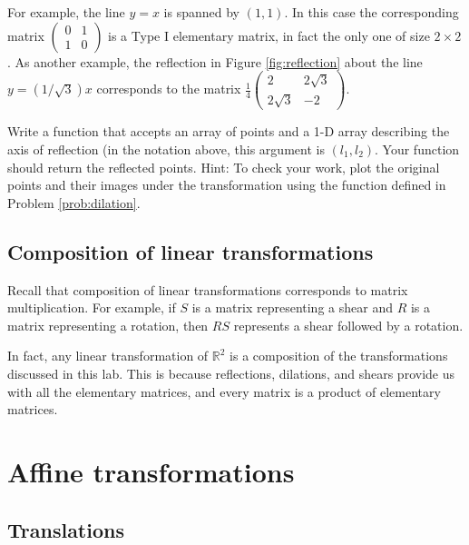 For example, the line $y=x$ is spanned by $(1, 1)$. 
In this case the corresponding matrix $\begin{pmatrix}
0 & 1\\
1 & 0
\end{pmatrix}$ is a Type I elementary matrix, in fact the only one of size $2 \times 2$. 
As another example, the reflection in Figure \ref{fig:reflection} about the line $y = (1/\sqrt{3})x$ corresponds to the matrix $\frac{1}{4}\begin{pmatrix}
2 & 2\sqrt{3}\\
2\sqrt{3} & -2
\end{pmatrix}$.

\begin{problem}
Write a function that accepts an array of points and a 1-D array describing the axis of reflection (in the notation above, this argument is $(l_1, l_2)$. 
Your function should return the reflected points. 
Hint: To check your work, plot the original points and their images under the transformation using the function  defined in Problem \ref{prob:dilation}.
\end{problem}

\subsection*{Composition of linear transformations}
Recall that composition of linear transformations corresponds to matrix multiplication. 
For example, if $S$ is a matrix representing a shear and $R$ is a matrix representing a rotation, then $RS$ represents a shear followed by a rotation.

In fact, any linear transformation of $\mathbb{R}^2$ is a composition of the transformations discussed in this lab. 
This is because reflections, dilations, and shears provide us with all the elementary matrices, and every matrix is a product of elementary matrices. 

\section*{Affine transformations}
\subsection*{Translations}

